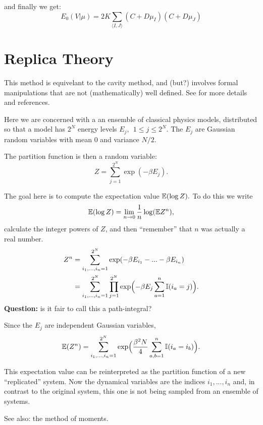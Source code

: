 \documentclass[11pt]{article}
\begin{document}
and finally we get:
$$\boxed{E_{0}(V | \mu) = 2K\sum_{\langle I,J\rangle} (C+D\mu_{I})(C+D\mu_{J})}$$


%
%

\section{Replica Theory}

This method is equivelant to the cavity method, and (but?)
involves formal manipulations that are not (mathematically) well defined.
See \cite{Mezard2009,Parisi2007} for more details and references.

Here we are concerned with a an ensemble of classical physics models,
distributed so that a model
has $2^N$ energy levels $E_j,\ \ 1\le j\le 2^N$. The $E_j$ are
Gaussian random variables with mean $0$ and variance $N/2.$

The partition function is then a random variable:
$$
    Z = \sum_{j=1}^{2^N} \exp(-\beta E_j).
$$

The goal here is to compute the expectation value $\mathbb E(\log Z).$
To do this we write
$$
    \mathbb E(\log Z) = \lim_{n\to 0} \frac{1}{n} \log(\mathbb E Z^n),
$$
calculate the integer powers of $Z$, and then ``remember'' that
$n$ was actually a real number.
\begin{align*}
    Z^n &= \sum_{i_1,...,i_n=1}^{2^N} \exp(-\beta E_{i_1} - ... -\beta E_{i_n})\\
        &= \sum_{i_1,...,i_n=1}^{2^N} \prod_{j=1}^{2^N} \exp\Bigl(-\beta E_j \sum_{a=1}^n \mathbb I(i_a=j)\Bigr).
\end{align*}
{\bf Question:} is it fair to call this a path-integral?

Since the $E_j$ are independent Gaussian variables,
$$
    \mathbb E(Z^n) = \sum_{i_1,...,i_n=1}^{2^N} \exp\Bigl(\frac{\beta^2N}{4} \sum_{a,b=1}^n \mathbb I(i_a=i_b)\Bigr).
$$

This expectation value can be reinterpreted as the partition
function of a new ``replicated'' system. Now the dynamical variables
are the indices $i_1,...,i_n$ and, in contrast to the original system,
this one is not being sampled from an ensemble of systems.

See also: the method of moments.

%
\end{document}

